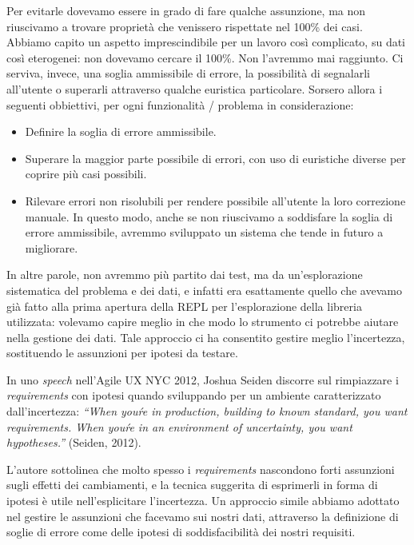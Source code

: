 \documentclass[12pt]{report}
\begin{document}
Per evitarle dovevamo essere in grado di fare qualche assunzione, ma non riuscivamo a trovare proprietà che venissero rispettate nel 100\% dei casi. Abbiamo capito un aspetto imprescindibile per un lavoro così complicato, su dati così eterogenei: non dovevamo cercare il 100\%. Non l'avremmo mai raggiunto. Ci serviva, invece, una soglia ammissibile di errore, la possibilità di segnalarli all'utente o superarli attraverso qualche euristica particolare. Sorsero allora i seguenti obbiettivi, per ogni funzionalità / problema in considerazione: 

\begin{itemize}
  \item Definire la soglia di errore ammissibile.
  \item Superare la maggior parte possibile di errori, con uso di euristiche diverse per coprire più casi possibili.
  \item Rilevare errori non risolubili per rendere possibile all'utente la loro correzione manuale. In questo modo, anche se non riuscivamo a soddisfare la soglia di errore ammissibile, avremmo sviluppato un sistema che tende in futuro a migliorare.
\end{itemize}

In altre parole, non avremmo più partito dai test, ma da un'esplorazione sistematica del problema e dei dati, e infatti era esattamente quello che avevamo già fatto alla prima apertura della REPL per l'esplorazione della libreria utilizzata: volevamo capire meglio in che modo lo strumento ci potrebbe aiutare nella gestione dei dati. Tale approccio ci ha consentito gestire meglio l'incertezza, sostituendo le assunzioni per ipotesi da testare.

In uno \textit{speech} nell'Agile UX NYC 2012, Joshua Seiden discorre sul rimpiazzare i \textit{requirements} con ipotesi quando sviluppando per un ambiente caratterizzato dall'incertezza: \textit{``When you\'re in production, building to known standard, you want requirements. When you\'re in an environment of uncertainty, you want hypotheses.''} (Seiden, 2012).

L'autore sottolinea che molto spesso i \textit{requirements} nascondono forti assunzioni sugli effetti dei cambiamenti, e la tecnica suggerita di esprimerli in forma di ipotesi è utile nell'esplicitare l'incertezza. Un approccio simile abbiamo adottato nel gestire le assunzioni che facevamo sui nostri dati, attraverso la definizione di soglie di errore come delle ipotesi di soddisfacibilità dei nostri requisiti.
\end{document}

